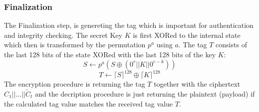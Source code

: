 \subsubsection{Finalization}
The Finalization step, is genereting the tag which is important for authentication and integrity checking.
The secret Key $K$ is first XORed to the internal state which then is transformed by the permutation $p^a$ using $a$. The tag $T$ consists of the last 128 bits of the state XORed with the last 128 bits of the key $K$: %
$$S \leftarrow p^a(S \oplus (0^r || K || 0^{c-k}))$$
$$ T \leftarrow \lceil S  \rceil^{128} \oplus \lceil K \rceil^{128}$$
The encryption procedure is returning the tag $T$ together with the ciphertext $C_1||...||\tilde C_t$ and the decription procedure is just returning the plaintext (payload) if the calculated tag value matches the received tag value $T$. \cite{DBLP:journals/joc/DobraunigEMS21}